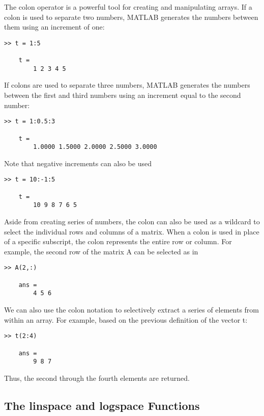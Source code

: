 \documentclass[../main.tex]{subfiles}
\begin{document}
The colon operator is a powerful tool for creating and manipulating arrays. If a colon is
used to separate two numbers, MATLAB generates the numbers between them using an
increment of one:
\begin{lstlisting}[frame=none, numbers=none]
	>> t = 1:5

	t =
		1 2 3 4 5
\end{lstlisting}
If colons are used to separate three numbers, MATLAB generates the numbers between the
first and third numbers using an increment equal to the second number:
\begin{lstlisting}[frame=none, numbers=none]
	>> t = 1:0.5:3

	t =
		1.0000 1.5000 2.0000 2.5000 3.0000
\end{lstlisting}
Note that negative increments can also be used
\begin{lstlisting}[frame=none, numbers=none]
	>> t = 10:-1:5

	t =
		10 9 8 7 6 5
\end{lstlisting}
Aside from creating series of numbers, the colon can also be used as a wildcard to select the individual rows and columns of a matrix. When a colon is used in place of a specific subscript, the colon represents the entire row or column. For example, the second row
of the matrix A can be selected as in
\begin{lstlisting}[frame=none, numbers=none]
	>> A(2,:)

	ans =
		4 5 6
\end{lstlisting}
We can also use the colon notation to selectively extract a series of elements from
within an array. For example, based on the previous definition of the vector t:
\begin{lstlisting}[frame=none, numbers=none]
	>> t(2:4)

	ans =
		9 8 7
\end{lstlisting}
Thus, the second through the fourth elements are returned.

\subsection{The linspace and logspace Functions}
\end{document}
